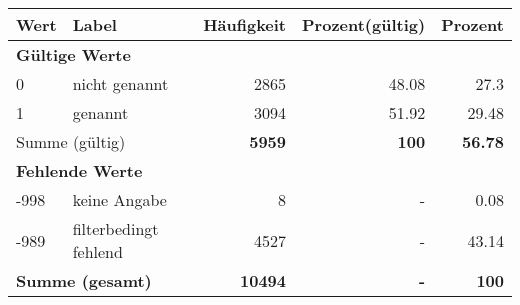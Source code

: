      \begin{longtable}{lXrrr}
     \toprule
     \textbf{Wert} & \textbf{Label} & \textbf{Häufigkeit} & \textbf{Prozent(gültig)} & \textbf{Prozent} \\
     \endhead
     \midrule
     \multicolumn{5}{l}{\textbf{Gültige Werte}}\\

     0 &
     \multicolumn{1}{X}{ nicht genannt   } &


       \num{2865} &
       \num[round-mode=places,round-precision=2]{48.08} &
         \num[round-mode=places,round-precision=2]{27.3} \\

     1 &
     \multicolumn{1}{X}{ genannt   } &


       \num{3094} &
       \num[round-mode=places,round-precision=2]{51.92} &
         \num[round-mode=places,round-precision=2]{29.48} \\
     \midrule
     \multicolumn{2}{l}{Summe (gültig)} &
       \textbf{\num{5959}} &
     \textbf{\num{100}} &
       \textbf{\num[round-mode=places,round-precision=2]{56.78}} \\
     \multicolumn{5}{l}{\textbf{Fehlende Werte}}\\
       -998 &
       keine Angabe &
         \num{8} &
        - &
         \num[round-mode=places,round-precision=2]{0.08} \\
       -989 &
       filterbedingt fehlend &
         \num{4527} &
        - &
         \num[round-mode=places,round-precision=2]{43.14} \\
     \midrule
     \multicolumn{2}{l}{\textbf{Summe (gesamt)}} &
          \textbf{\num{10494}} &
        \textbf{-} &
        \textbf{\num{100}} \\
     \bottomrule
     \end{longtable}
     
